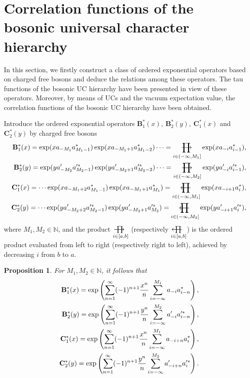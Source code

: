 \documentclass[11pt,reqno]{amsart}
\numberwithin{equation}{section}
\newtheorem{proposition}[theorem]{Proposition}
\def\lprod{\mathop{\prod{\mkern-29.5mu}{\mathbf\longleftarrow}}}
\def\rprod{\mathop{\prod{\mkern-28.0mu}{\mathbf\longrightarrow}}}
\begin{document}
\section{Correlation functions of the bosonic universal character hierarchy}
In this section, we firstly construct a class of ordered exponential operators based on charged free bosons and deduce the relations among these operators. The tau functions of the bosonic UC hierarchy have been presented in view of these operators. Moreover, by means of UCs and  the vacuum expectation value, the correlation functions of the bosonic UC hierarchy have been obtained.



Introduce the ordered exponential operators $\mathbf{B}^{\ast}_{1}(x),\ \mathbf{B}^{\ast}_{2}(y),\ \mathbf{C}^{\ast}_{1}(x)$ and $\mathbf{C}^{\ast}_{2}(y)$  by charged free bosons
\begin{eqnarray}
&&\mathbf{B}^{\ast}_{1}(x)=\exp(xa_{-M_{1}}a^{\ast}_{M_{1}-1})
\exp(xa_{-M_{1}+1}a^{\ast}_{M_{1}-2})\cdots=\rprod\limits
_{i\in(-\infty,M_{1}]}\exp(xa_{-i}a^{\ast}_{i-1}),\notag\\
&&\mathbf{B}^{\ast}_{2}(y)=\exp(ya^{\prime}_{-M_{2}}a^{\prime\ast}_{M_{2}-1})
\exp(ya^{\prime}_{-M_{2}+1}a^{\prime\ast}_{M_{2}-2})\cdots=\rprod\limits
_{i\in(-\infty,M_{2}]}\exp(ya^{\prime}_{-i}a^{\prime\ast}_{i-1}),\notag\\
&&\mathbf{C}^{\ast}_{1}(x)=\cdots\exp(xa_{-M_{1}+2}a^{\ast}_{M_{1}-1})
\exp(xa_{-M_{1}+1}a^{\ast}_{M_{1}})=\lprod\limits_{i\in(-\infty,M_{1}]}
\exp(xa_{-i+1}a^{\ast}_{i}),\notag\\
&&\mathbf{C}^{\ast}_{2}(y)=\cdots\exp(ya^{\prime}_{-M_{2}+2}a^{\prime\ast}_{M_{2}-1})
\exp(ya^{\prime}_{-M_{2}+1}a^{\prime\ast}_{M_{2}})=\lprod\limits_{i\in(-\infty,M_{2}]}
\exp(ya^{\prime}_{-i+1}a^{\prime\ast}_{i}),
\end{eqnarray}
where $M_{1},M_{2}\in\mathbb{N}$, and the product $\rprod\limits_{i\in[a,b]}$ (respectively $\lprod\limits_{i\in[a,b]}$) is the ordered product evaluated from left to right (respectively right to left), achieved by decreasing $i$ from $b$ to $a$.

\begin{proposition}\label{Bzong}
For $M_{1},M_{2}\in\mathbb{N}$, it follows that
\begin{eqnarray}
&&\mathbf{B}^{\ast}_{1}(x)=\exp\left(\sum\limits^{\infty}_{n=1}(-1)^{n+1}
\frac{x^{n}}{n}\sum\limits^{M_{1}}_{i=-\infty}a_{-i}a^{\ast}_{i-n}\right),\notag\\
&&\mathbf{B}^{\ast}_{2}(y)=\exp\left(\sum\limits^{\infty}_{n=1}(-1)^{n+1}
\frac{y^{n}}{n}\sum\limits^{M_{2}}_{i=-\infty}a^{\prime}_{-i}
a^{\prime\ast}_{i-n}\right),\notag\\
&&\mathbf{C}^{\ast}_{1}(x)=\exp\left(\sum\limits^{\infty}_{n=1}(-1)^{n+1}
\frac{x^{n}}{n}\sum\limits^{M_{1}}_{i=-\infty}a_{-i+n}a^{\ast}_{i}\right),\notag\\
&&\mathbf{C}^{\ast}_{2}(y)=\exp\left(\sum\limits^{\infty}_{n=1}(-1)^{n+1}
\frac{y^{n}}{n}\sum\limits^{M_{2}}_{i=-\infty}a^{\prime}_{-i+n}a^{\prime\ast}_{i}\right).
\end{eqnarray}
\end{proposition}
\end{document}
